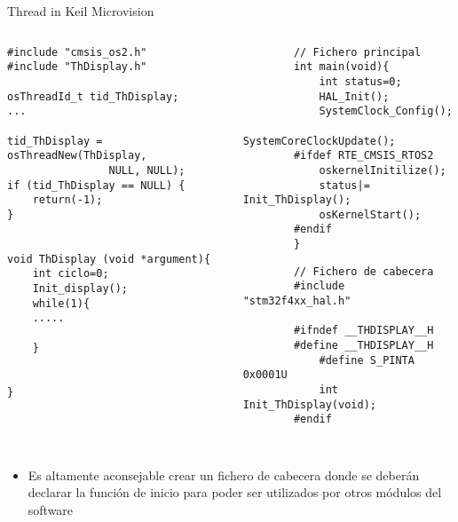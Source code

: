 \begin{frame}[fragile]{Thread in Keil Microvision}
    \begin{columns}
        \begin{column}{0.50\textwidth}
            \begin{verbatim}
#include "cmsis_os2.h"
#include "ThDisplay.h"

osThreadId_t tid_ThDisplay; 
...

tid_ThDisplay = osThreadNew(ThDisplay, 
                NULL, NULL);
if (tid_ThDisplay == NULL) {
    return(-1);
}


void ThDisplay (void *argument){
    int ciclo=0;
    Init_display();
    while(1){
    .....
    
    }
   

}
            \end{verbatim}
        \end{column}
    \begin{column}{0.50\textwidth}
        \begin{verbatim}
        // Fichero principal
        int main(void){
            int status=0;
            HAL_Init();
            SystemClock_Config();
            SystemCoreClockUpdate();
        #ifdef RTE_CMSIS_RTOS2
            oskernelInitilize();
            status|= Init_ThDisplay();
            osKernelStart();
        #endif
        }
        \end{verbatim}
        \begin{verbatim}
        // Fichero de cabecera      
        #include "stm32f4xx_hal.h"
        
        #ifndef __THDISPLAY__H
        #define __THDISPLAY__H
            #define S_PINTA  0x0001U
            int Init_ThDisplay(void);
        #endif
        
        \end{verbatim}
    \end{column}
    \end{columns}
    \begin{itemize}
        \item Es altamente aconsejable crear un fichero de cabecera donde se deberán declarar la función de inicio para poder ser utilizados por otros módulos del software

    \end{itemize}
\end{frame}

